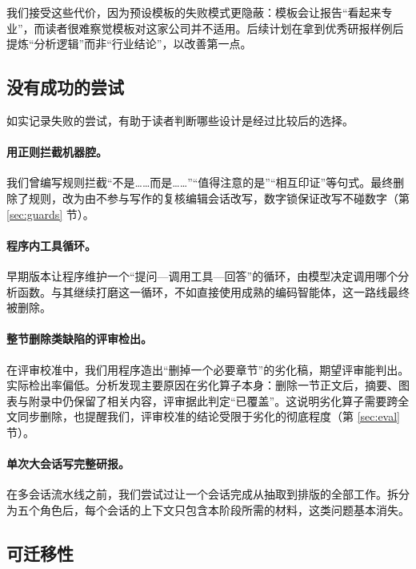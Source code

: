 我们接受这些代价，因为预设模板的失败模式更隐蔽：模板会让报告“看起来专业”，而读者很难察觉模板对这家公司并不适用。后续计划在拿到优秀研报样例后提炼“分析逻辑”而非“行业结论”，以改善第一点。

\subsection{没有成功的尝试}
\label{sec:disc-negative}

如实记录失败的尝试，有助于读者判断哪些设计是经过比较后的选择。

\paragraph{用正则拦截机器腔。}我们曾编写规则拦截“不是……而是……”“值得注意的是”“相互印证”等句式。最终删除了规则，改为由不参与写作的复核编辑会话改写，数字锁保证改写不碰数字（第 \ref{sec:guards} 节）。

\paragraph{程序内工具循环。}早期版本让程序维护一个“提问—调用工具—回答”的循环，由模型决定调用哪个分析函数。与其继续打磨这一循环，不如直接使用成熟的编码智能体，这一路线最终被删除。

\paragraph{整节删除类缺陷的评审检出。}在评审校准中，我们用程序造出“删掉一个必要章节”的劣化稿，期望评审能判出。实际检出率偏低。分析发现主要原因在劣化算子本身：删除一节正文后，摘要、图表与附录中仍保留了相关内容，评审据此判定“已覆盖”。这说明劣化算子需要跨全文同步删除，也提醒我们，评审校准的结论受限于劣化的彻底程度（第 \ref{sec:eval} 节）。

\paragraph{单次大会话写完整研报。}在多会话流水线之前，我们尝试过让一个会话完成从抽取到排版的全部工作。拆分为五个角色后，每个会话的上下文只包含本阶段所需的材料，这类问题基本消失。

\subsection{可迁移性}
\label{sec:disc-transfer}

